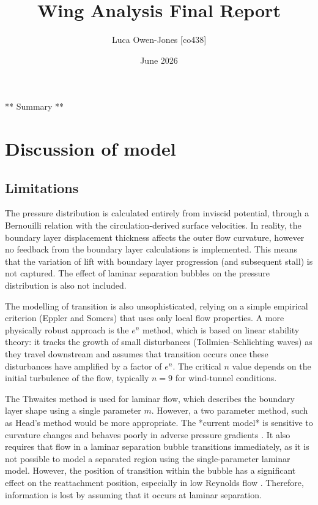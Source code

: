 \documentclass[a4paper,11pt]{article}
\title{\vspace{-2cm} Wing Analysis Final Report}
\author{\vspace{-1cm} Luca Owen-Jones [co438]}
\date{\vspace{-0.5cm} June 2026}
\begin{document}
\maketitle

** Summary **

\section{Discussion of model}

\subsection{Limitations}\label{sec:limit}

The pressure distribution is calculated entirely from inviscid potential, through a Bernouilli relation with the circulation-derived surface velocities. In reality, the boundary layer displacement thickness affects the outer flow curvature, however no feedback from the boundary layer calculations is implemented. This means that the variation of lift with boundary layer progression (and subsequent stall) is not captured. The effect of laminar separation bubbles on the pressure distribution is also not included.

The modelling of transition is also unsophisticated, relying on a simple empirical criterion (Eppler and Somers) that uses only local flow properties. A more physically robust approach is the $e^{n}$ method, which is based on linear stability theory: it tracks the growth of small disturbances (Tollmien–Schlichting waves) as they travel downstream and assumes that transition occurs once these disturbances have amplified by a factor of $e^{n}$. The critical $n$ value depends on the initial turbulence of the flow, typically $n=9$ for wind-tunnel conditions. 

The Thwaites method is used for laminar flow, which describes the boundary layer shape using a single parameter $m$. However, a two parameter method, such as Head's method \cite{boundarylayersyoung} would be more appropriate. The *current model* is sensitive to curvature changes and behaves poorly in adverse pressure gradients \cite{oneparameterbad}. It also requires that flow in a laminar separation bubble transitions immediately, as it is not possible to model a separated region using the single-parameter laminar model. However, the position of transition within the bubble has a significant effect on the reattachment position, especially in low Reynolds flow \cite{lowspeeddesign}. Therefore, information is lost by assuming that it occurs at laminar separation.
\end{document}
